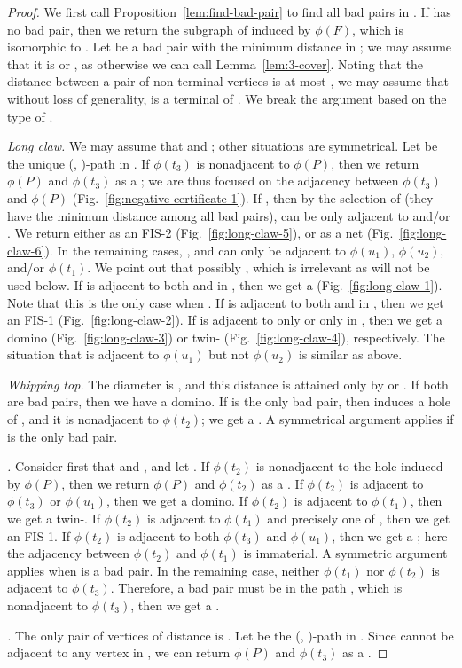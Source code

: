 \documentclass[10pt]{article}
\newcommand{\stpath}[2]{(, )-path}
\newcommand{\og}[1]{\ensuremath{\phi(#1)}}
\begin{document}
\begin{proof}
  We first call Proposition~\ref{lem:find-bad-pair} to find all bad
  pairs in .  If  has no bad pair, then we return the subgraph
  of  induced by \og{F}, which is isomorphic to .  Let  be
  a bad pair with the minimum distance in ; we may assume that it
  is  or , as otherwise we can call Lemma~\ref{lem:3-cover}.
  Noting that the distance between a pair of non-terminal vertices is
  at most , we may assume that without loss of generality,  is a
  terminal of .  We break the argument based on the type of .

  {\em Long claw.}  We may assume that  and ; other situations are symmetrical.  Let  be the
  unique \stpath{x}{y} in .  If \og{t_3} is nonadjacent to \og{P},
  then we return \og{P} and \og{t_3} as a ; we are thus focused
  on the adjacency between \og{t_3} and \og{P}
  (Fig.~\ref{fig:negative-certificate-1}).  If , then by the
  selection of  (they have the minimum distance among all bad
  pairs),  can be only adjacent to  and/or
  .  We return either  as an FIS-2
  (Fig.~\ref{fig:long-claw-5}), or 
  as a net (Fig.~\ref{fig:long-claw-6}).  In the remaining cases, , and  can only be adjacent to \og{u_1}, \og{u_2},
  and/or \og{t_1}.  We point out that possibly ,
  which is irrelevant as  will not be used below.  If
   is adjacent to both  and  in ,
  then we get a  (Fig.~\ref{fig:long-claw-1}).  Note that
  this is the only case when .  If  is
  adjacent to both  and  in , then we get an
  FIS-1 (Fig.~\ref{fig:long-claw-2}).  If  is adjacent to
  only  or only  in , then we get a domino
  (Fig.~\ref{fig:long-claw-3}) or twin-
  (Fig.~\ref{fig:long-claw-4}), respectively.  The situation that
   is adjacent to \og{u_1} but not \og{u_2} is similar as
  above.

  {\em Whipping top.} The diameter is , and this distance is
  attained only by  or .  If both are bad
  pairs, then we have a domino.  If  is the only bad
  pair, then  induces a hole of , and it is
  nonadjacent to \og{t_2}; we get a .  A symmetrical argument
  applies if  is the only bad pair.

  {\em \dag.}  Consider first that  and , and let .  If \og{t_2} is nonadjacent to the hole
  induced by \og{P}, then we return \og{P} and \og{t_2} as a .
  If \og{t_2} is adjacent to \og{t_3} or \og{u_1}, then we get a
  domino.  If \og{t_2} is adjacent to \og{t_1}, then we get a
  twin-.  If \og{t_2} is adjacent to \og{t_1} and precisely one
  of , then we get an FIS-1.  If \og{t_2} is
  adjacent to both \og{t_3} and \og{u_1}, then we get a ;
  here the adjacency between \og{t_2} and \og{t_1} is immaterial.  A
  symmetric argument applies when  is a bad pair.  In
  the remaining case, neither \og{t_1} nor \og{t_2} is adjacent to
  \og{t_3}.  Therefore, a bad pair must be in the path ,
  which is nonadjacent to \og{t_3}, then we get a .

  {\em \ddag.} The only pair of vertices of distance  is .  Let  be the \stpath{t_1}{t_2} in .  Since
   cannot be adjacent to any vertex in , we can
  return \og{P} and \og{t_3} as a .
\end{proof}
\end{document}
